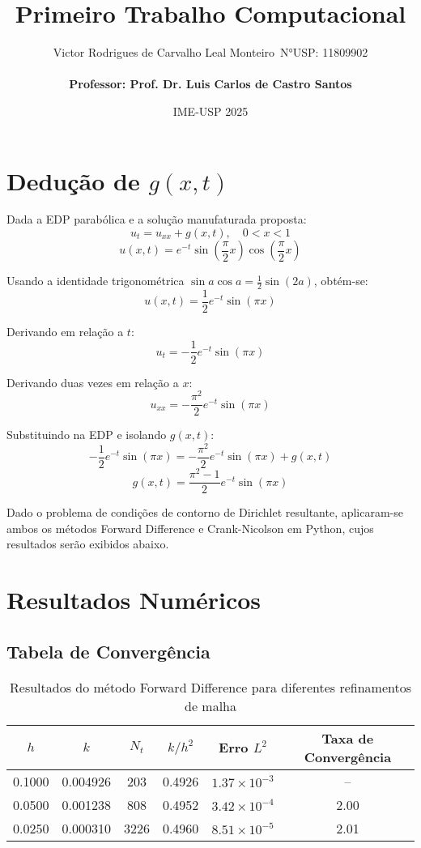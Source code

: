 \documentclass[a4paper, 12pt]{article}
\title{Primeiro Trabalho Computacional}
\author{
Victor Rodrigues de Carvalho Leal Monteiro\ 
N°USP: 11809902 \\
\\
{\textbf{Professor: Prof. Dr. Luis Carlos de Castro Santos}}}
\date{IME-USP 2025}
\begin{document}
\maketitle


\section*{Dedução de \( g(x,t) \)}

Dada a EDP parabólica e a solução manufaturada proposta:
\[
u_t = u_{xx} + g(x,t), \quad 0 < x < 1
\]
\[
u(x,t) = e^{-t} \sin\left( \frac{\pi}{2} x \right) \cos\left( \frac{\pi}{2} x \right)
\]

Usando a identidade trigonométrica \(\sin a \cos a = \frac{1}{2}\sin(2a)\), obtém-se:
\[
u(x,t) = \frac{1}{2} e^{-t} \sin(\pi x)
\]

Derivando em relação a \(t\):
\[
u_t = -\frac{1}{2} e^{-t} \sin(\pi x)
\]

Derivando duas vezes em relação a \(x\):
\[
u_{xx} = -\frac{\pi^2}{2} e^{-t} \sin(\pi x)
\]

Substituindo na EDP e isolando \(g(x,t)\):
\[
-\frac{1}{2} e^{-t} \sin(\pi x) = -\frac{\pi^2}{2} e^{-t} \sin(\pi x) + g(x,t)
\]
\[
\boxed{g(x,t) = \frac{\pi^2 - 1}{2} e^{-t} \sin(\pi x)}
\]

Dado o problema de condições de contorno de Dirichlet resultante, aplicaram-se ambos os métodos Forward Difference e Crank-Nicolson em Python, cujos resultados serão exibidos abaixo.

\pagebreak

\section{Resultados Numéricos}

\subsection{Tabela de Convergência}

\begin{table}[H]
\centering
\caption{Resultados do método Forward Difference para diferentes refinamentos de malha}
\label{tab:convergencia}
\begin{tabular}{cccccc}
\toprule
$h$ & $k$ & $N_t$ & $k/h^2$ & Erro $L^2$ & Taxa de Convergência \\
\midrule
0.1000 & 0.004926 & 203 & 0.4926 & $1.37 \times 10^{-3}$ & -- \\
0.0500 & 0.001238 & 808 & 0.4952 & $3.42 \times 10^{-4}$ & 2.00 \\
0.0250 & 0.000310 & 3226 & 0.4960 & $8.51 \times 10^{-5}$ & 2.01 \\
\bottomrule
\end{tabular}
\end{table}
\end{document}
